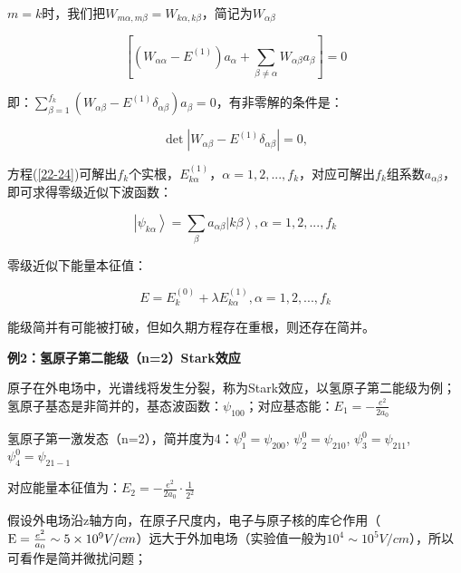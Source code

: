 $m = k$时，我们把$W_{m\alpha ,m\beta }  = W_{k\alpha ,k\beta } $，简记为$W_{\alpha \beta } $

\begin{equation}\label{22-23}
\left[ {\left( {W_{\alpha \alpha }  - E^{(1)} } \right)a_\alpha   + \sum\limits_{\beta  \ne \alpha } {W_{\alpha \beta } a_\beta  } } \right] = 0
\end{equation}

即：$\sum\limits_{\beta  = 1}^{f_k } {\left( {W_{\alpha \beta }  - E^{(1)} \delta _{\alpha \beta } } \right)a_\beta  }  = 0$，有非零解的条件是：

\begin{equation}\label{22-24}
\det \left| {W_{\alpha \beta }  - E^{(1)} \delta _{\alpha \beta } } \right| = 0 ,
\end{equation}

方程(\ref{22-24})可解出$f_k$个实根，$E_{k\alpha }^{(1)} $，$\alpha  = 1,2,...,f_k $，对应可解出$f_k$组系数$a_{\alpha \beta } $，即可求得零级近似下波函数：

\begin{equation}\label{22-25}
\left| {\psi _{k\alpha } } \right\rangle  = \sum\limits_\beta  {a_{\alpha \beta } \left| {k\beta } \right\rangle } ,\alpha  = 1,2,...,f_k
\end{equation}

零级近似下能量本征值：

\begin{equation}\label{22-26}
E = E_k^{(0)}  + \lambda E_{k\alpha }^{(1)} , \alpha  = 1,2,...,f_k
\end{equation}

能级简并有可能被打破，但如久期方程存在重根，则还存在简并。

\textbf{例2：氢原子第二能级（n=2）Stark效应}


原子在外电场中，光谱线将发生分裂，称为Stark效应，以氢原子第二能级为例；
氢原子基态是非简并的，基态波函数：$\psi _{100} $；对应基态能：$E_1  =  - \frac{{e^2 }}{{2a_0 }}$


氢原子第一激发态（n=2），简并度为4：$\psi _1^0  = \psi _{200} $, $\psi _2^0  = \psi _{210} $, $\psi _3^0  = \psi _{211} $, $\psi _4^0  = \psi _{21 - 1} $


对应能量本征值为：$E_2  =  - \frac{{e^2 }}{{2a_0 }} \cdot \frac{1}{{2^2 }}$


假设外电场沿z轴方向，在原子尺度内，电子与原子核的库仑作用（${\rm E} = \frac{{e^2 }}{{a_0 }} \sim 5 \times 10^9 V/cm$）远大于外加电场（实验值一般为$10^4  \sim 10^5 V/cm$），所以可看作是简并微扰问题；

